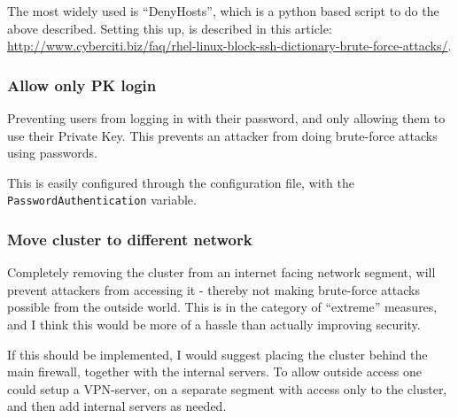 The most widely used is ``DenyHosts'', which is a python based script to do 
the above described. Setting this up, is described in this article:
\href{http://www.cyberciti.biz/faq/rhel-linux-block-ssh-dictionary-brute-force-attacks/}
     {http://www.cyberciti.biz/faq/rhel-linux-block-ssh-dictionary-brute-force-attacks/}.

\subsubsection{Allow only PK login}
Preventing users from logging in with their password, and only allowing them to
use their Private Key. This prevents an attacker from doing brute-force attacks
using passwords.

This is easily configured through the configuration file, with the
\texttt{PasswordAuthentication} variable.

\subsubsection{Move cluster to different network}
Completely removing the cluster from an internet facing network segment, will
prevent attackers from accessing it - thereby not making brute-force attacks
possible from the outside world. This is in the category of ``extreme''
measures, and I think this would be more of a hassle than actually improving
security.

If this should be implemented, I would suggest placing the cluster behind the 
main firewall, together with the internal servers. To allow outside access one 
could setup a VPN-server, on a separate segment with access only to the cluster,
and then add internal servers as needed.



